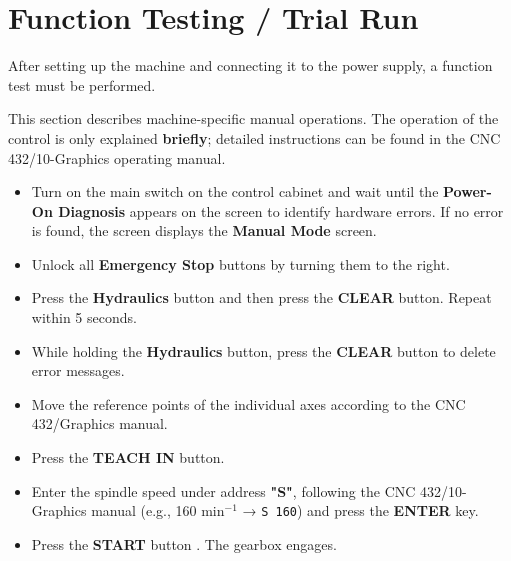 
\section{Function Testing / Trial Run}

After setting up the machine and connecting it to the power supply, a function test must be performed.

\vspace{.3cm}

\noindent This section describes machine-specific manual operations. The operation of the control is only explained \textbf{briefly}; detailed instructions can be found in the CNC 432/10-Graphics operating manual.

\begin{itemize}
    \item Turn on the main switch on the control cabinet and wait until the \textbf{Power-On Diagnosis} appears on the screen to identify hardware errors. If no error is found, the screen displays the \textbf{Manual Mode} screen.
    
    \item Unlock all \textbf{Emergency Stop} buttons by turning them to the right.
    
    \item Press the \textbf{Hydraulics} button  and then press the \textbf{CLEAR} button. Repeat within 5 seconds.
    
    \item While holding the \textbf{Hydraulics} button, press the \textbf{CLEAR} button to delete error messages.
    
    \item Move the reference points of the individual axes according to the CNC 432/Graphics manual.
    
    \item Press the \textbf{TEACH IN} button.
    
    \item Enter the spindle speed under address \textbf{"S"}, following the CNC 432/10-Graphics manual (e.g., 160 min\(^{-1}\) → \texttt{S 160}) and press the \textbf{ENTER} key.
    
    \item Press the \textbf{START} button . The gearbox engages.
\end{itemize}

